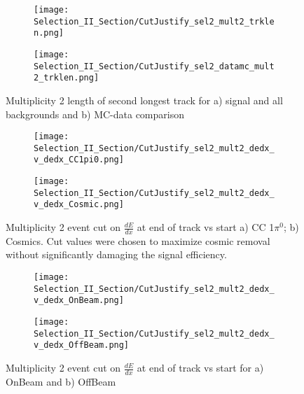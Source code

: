 \begin{figure}[H]
  \begin{subfigure}[t]{0.4\textwidth}
    \texttt{[image: Selection\_II\_Section/CutJustify\_sel2\_mult2\_trklen.png]}
    \caption{ }
  \end{subfigure} 
  \hspace{15mm}
  \begin{subfigure}[t]{0.4\textwidth}
    \texttt{[image: Selection\_II\_Section/CutJustify\_sel2\_datamc\_mult2\_trklen.png]}
    \caption{ }
  \end{subfigure} 

\caption{Multiplicity 2 length of second longest track for a) signal and all backgrounds and b) MC-data comparison }
\label{fig:cutjust_sel2_mult2_secondtrklen}
\end{figure}


\begin{figure}[H]
\centering
  \begin{subfigure}[t]{0.36\textwidth}
    \centering
\texttt{[image: Selection\_II\_Section/CutJustify\_sel2\_mult2\_dedx\_v\_dedx\_CC1pi0.png]}
    \caption{ }
  \end{subfigure} 
  \hspace{5mm}
  \begin{subfigure}[t]{0.36\textwidth}
    \centering
\texttt{[image: Selection\_II\_Section/CutJustify\_sel2\_mult2\_dedx\_v\_dedx\_Cosmic.png]}
    \caption{ }
  \end{subfigure} 

\caption{ Multiplicity 2 event cut on $\frac{dE}{dx}$ at end of track vs start a) CC 1$\pi^0$; b) Cosmics. Cut values were chosen to maximize cosmic removal without significantly damaging the signal efficiency. }
\label{fig:cutjust_sel2_mult2_dedx_v_dedx_sig}
\end{figure}

\begin{figure}[H]
\centering
\begin{subfigure}[t]{0.36\textwidth}
    \centering
\texttt{[image: Selection\_II\_Section/CutJustify\_sel2\_mult2\_dedx\_v\_dedx\_OnBeam.png]}
    \caption{ }
  \end{subfigure} 
  \hspace{10mm}
  \begin{subfigure}[t]{0.36\textwidth}
    \centering
    \texttt{[image: Selection\_II\_Section/CutJustify\_sel2\_mult2\_dedx\_v\_dedx\_OffBeam.png]}
    \caption{ }
  \end{subfigure} 

\caption{ Multiplicity 2 event cut on $\frac{dE}{dx}$ at end of track vs start for a) OnBeam and b) OffBeam }
\label{fig:cutjust_sel2_onbeam_mult2_dedx_v_dedx}
\end{figure}

